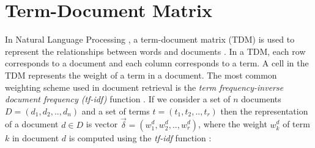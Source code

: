 
%
%
%




\section{Term-Document Matrix} \label{sec:TDM}
In Natural Language Processing \cite{Collobert:2011:NLP:1953048.2078186}, a term-document matrix (TDM) is used to represent the relationships between words and documents \cite{Turney:2010:FMV:1861751.1861756}. In a TDM, each row corresponds to a document and each column corresponds to a term. A cell in the TDM represents the weight of a term in a document. The most common weighting scheme used in document retrieval is the \emph{term frequency-inverse document frequency (tf-idf)} function \cite{Reed:2006:TNT:1193211.1193734}. If we consider a set of $n$ documents $D=(d_{1},d_{2},..,d_{n})$ and a set of terms $t=(t_{1},t_{2},..,t_{r})$ then the representation of a document $d \in D $ is vector $\vec{\delta}=(w_{1}^{d},w_{2}^{d},..,w_{r}^{d})$, where the weight $w_{k}^{d}$ of term $k$ in document $d$ is computed using the {\em tf-idf} function \cite{Ramos1999}:

